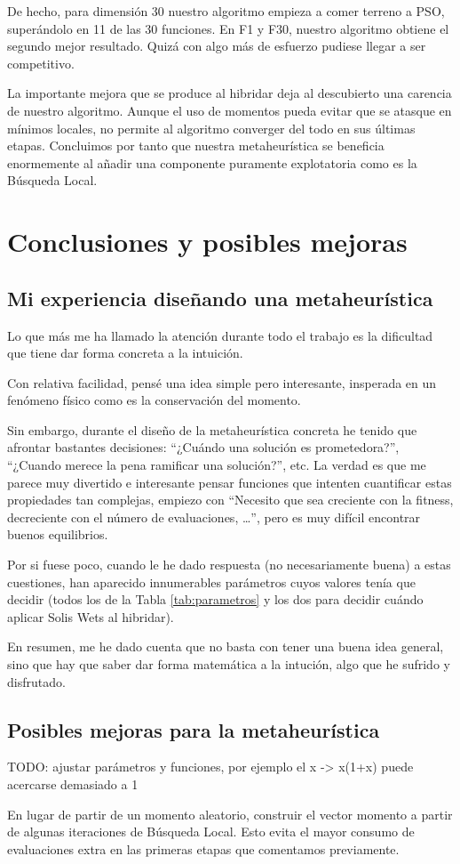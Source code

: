 \documentclass{article}
\begin{document}
De hecho, para dimensión 30 nuestro algoritmo empieza a comer terreno a PSO, superándolo en 11 de las 30 funciones. En F1 y F30, nuestro
algoritmo obtiene el segundo mejor resultado. Quizá con algo más de esfuerzo pudiese llegar a ser competitivo.

La importante mejora que se produce al hibridar deja al descubierto una carencia de nuestro algoritmo. Aunque el uso de momentos pueda
evitar que se atasque en mínimos locales, no permite al algoritmo converger del todo en sus últimas etapas. Concluimos por tanto que
nuestra metaheurística se beneficia enormemente al añadir una componente puramente explotatoria como es la Búsqueda Local.

\pagebreak

\section{Conclusiones y posibles mejoras}

\subsection{Mi experiencia diseñando una metaheurística}

Lo que más me ha llamado la atención durante todo el trabajo es la dificultad que tiene dar forma concreta a la intuición.

Con relativa facilidad, pensé una idea simple pero interesante, insperada en un fenómeno físico como es la conservación del momento.

Sin embargo, durante el diseño de la metaheurística concreta he tenido que afrontar bastantes decisiones: ``¿Cuándo una solución es prometedora?'', ``¿Cuando merece la pena ramificar una solución?'', etc. La verdad es que me parece muy divertido e interesante pensar
 funciones que intenten cuantificar estas propiedades tan complejas, empiezo con ``Necesito que sea creciente con la fitness, decreciente
 con el número de evaluaciones, \ldots'', pero es muy difícil encontrar buenos equilibrios.

Por si fuese poco, cuando le he dado respuesta (no necesariamente buena) a estas cuestiones, han aparecido innumerables parámetros cuyos
valores tenía que decidir (todos los de la Tabla \ref{tab:parametros} y los dos para decidir cuándo aplicar Solis Wets al hibridar).

En resumen, me he dado cuenta que no basta con tener una buena idea general, sino que hay que saber dar forma matemática a la intución,
algo que he sufrido y disfrutado.

\subsection{Posibles mejoras para la metaheurística}

TODO: ajustar parámetros y funciones, por ejemplo el x -> x(1+x) puede acercarse demasiado a 1

En lugar de partir de un momento aleatorio, construir el vector momento a partir de algunas iteraciones de Búsqueda Local. Esto evita
el mayor consumo de evaluaciones extra en las primeras etapas que comentamos previamente. 
\end{document}
